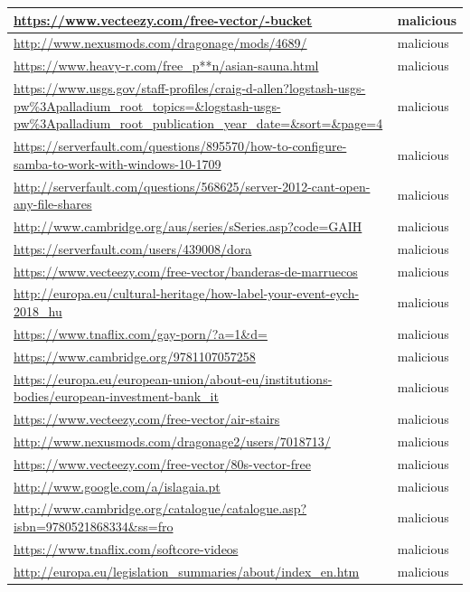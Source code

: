 \documentclass[12pt,twoside]{report}
\begin{document}
\begin{spacing}{1}
\begin{center}
\begin{longtable}{ |>{\raggedright\arraybackslash}p{}|>{\raggedright\arraybackslash}p{}| }
\hline
\url{https://www.vecteezy.com/free-vector/-bucket} & malicious
\\
\hline
\url{http://www.nexusmods.com/dragonage/mods/4689/} & malicious
\\
\hline
\url{https://www.heavy-r.com/free_p**n/asian-sauna.html} & malicious
\\
\hline
\url{https://www.usgs.gov/staff-profiles/craig-d-allen?logstash-usgs-pw\%3Apalladium_root_topics=&logstash-usgs-pw\%3Apalladium_root_publication_year_date=&sort=&page=4} & malicious
\\
\hline
\url{https://serverfault.com/questions/895570/how-to-configure-samba-to-work-with-windows-10-1709} & malicious
\\
\hline
\url{http://serverfault.com/questions/568625/server-2012-cant-open-any-file-shares} & malicious
\\
\hline
\url{http://www.cambridge.org/aus/series/sSeries.asp?code=GAIH} & malicious
\\
\hline
\url{https://serverfault.com/users/439008/dora} & malicious
\\
\hline
\url{https://www.vecteezy.com/free-vector/banderas-de-marruecos} & malicious
\\
\hline
\url{http://europa.eu/cultural-heritage/how-label-your-event-eych-2018_hu} & malicious
\\
\hline
\url{https://www.tnaflix.com/gay-porn/?a=1&d=} & malicious
\\
\hline
\url{https://www.cambridge.org/9781107057258} & malicious
\\
\hline
\url{https://europa.eu/european-union/about-eu/institutions-bodies/european-investment-bank_it} & malicious
\\
\hline
\url{https://www.vecteezy.com/free-vector/air-stairs} & malicious
\\
\hline
\url{http://www.nexusmods.com/dragonage2/users/7018713/} & malicious
\\
\hline
\url{https://www.vecteezy.com/free-vector/80s-vector-free} & malicious
\\
\hline
\url{http://www.google.com/a/islagaia.pt} & malicious
\\
\hline
\url{http://www.cambridge.org/catalogue/catalogue.asp?isbn=9780521868334&ss=fro} & malicious
\\
\hline
\url{https://www.tnaflix.com/softcore-videos} & malicious
\\
\hline
\url{http://europa.eu/legislation_summaries/about/index_en.htm} & malicious
\\
\hline

\end{longtable}
\end{center}
\end{spacing}
\end{document}

